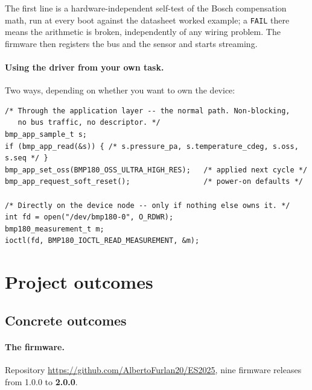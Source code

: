 \documentclass[10pt,a4]{article}
\begin{document}
The first line is a hardware-independent self-test of the Bosch compensation
math, run at every boot against the datasheet worked example; a \texttt{FAIL}
there means the arithmetic is broken, independently of any wiring problem. The
firmware then registers the bus and the sensor and starts streaming.

\paragraph{Using the driver from your own task.} Two ways, depending on whether
you want to own the device:

\begin{verbatim}
/* Through the application layer -- the normal path. Non-blocking,
   no bus traffic, no descriptor. */
bmp_app_sample_t s;
if (bmp_app_read(&s)) { /* s.pressure_pa, s.temperature_cdeg, s.oss, s.seq */ }
bmp_app_set_oss(BMP180_OSS_ULTRA_HIGH_RES);   /* applied next cycle */
bmp_app_request_soft_reset();                 /* power-on defaults */

/* Directly on the device node -- only if nothing else owns it. */
int fd = open("/dev/bmp180-0", O_RDWR);
bmp180_measurement_t m;
ioctl(fd, BMP180_IOCTL_READ_MEASUREMENT, &m);
\end{verbatim}

\section{Project outcomes}

\subsection{Concrete outcomes}

\paragraph{The firmware.} Repository
\url{https://github.com/AlbertoFurlan20/ES2025}, nine firmware
releases from 1.0.0 to \textbf{2.0.0}.
\end{document}
